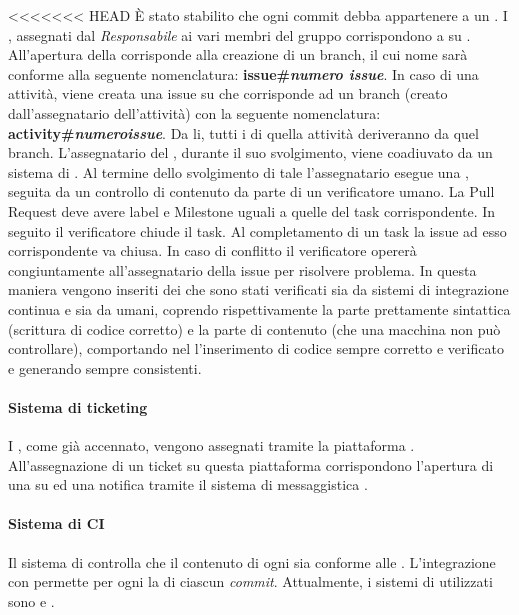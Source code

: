 <<<<<<< HEAD
È stato stabilito che ogni commit debba appartenere a un . I , assegnati dal \textit{Responsabile} ai vari membri del gruppo corrispondono a  su . All'apertura della  corrisponde alla creazione di un branch, il cui nome sarà conforme alla seguente nomenclatura: \textbf{issue\#\textit{numero issue}}. In caso di una attivit\`a, viene creata una issue su  che corrisponde ad un branch (creato dall'assegnatario dell'attivit\`a) con la seguente nomenclatura: \textbf{activity\#\textit{numeroissue}}. Da li, tutti i  di quella attivit\`a deriveranno da quel branch. L'assegnatario del , durante il suo svolgimento, viene coadiuvato da un sistema di . Al termine dello svolgimento di tale  l'assegnatario esegue una , seguita da un controllo di contenuto da parte di un verificatore umano. La Pull Request deve avere label e Milestone uguali a quelle del task corrispondente. In seguito il verificatore
chiude il task. Al completamento di un task la issue ad esso corrispondente va chiusa. In caso di conflitto il verificatore operer\`a congiuntamente all'assegnatario della issue per risolvere problema.
In questa maniera vengono inseriti dei  che sono stati verificati sia da sistemi di integrazione continua e sia da umani, coprendo rispettivamente la parte prettamente sintattica (scrittura di codice corretto) e la parte di contenuto (che una macchina non pu\`o controllare), comportando nel  l'inserimento di codice sempre corretto e verificato e generando  sempre consistenti.

\paragraph*{Sistema di ticketing} I , come già accennato, vengono assegnati tramite la piattaforma . All'assegnazione di un ticket su questa piattaforma corrispondono l'apertura di una  su  ed una notifica tramite il sistema di messaggistica .

\paragraph*{Sistema di CI}Il sistema di  controlla che il contenuto di ogni  sia conforme alle \NormeDiProgetto. L'integrazione con  permette per ogni  la  di ciascun \textit{commit}. Attualmente, i sistemi di  utilizzati sono  e .

